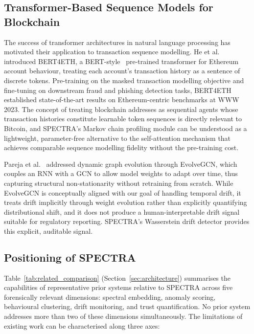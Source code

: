 \subsection{Transformer-Based Sequence Models for Blockchain}
\label{subsec:transformers}

The success of transformer architectures in natural language processing has
motivated their application to transaction sequence modelling.  He et
al.~\cite{He2023} introduced BERT4ETH, a BERT-style~\cite{Lin2017}
pre-trained transformer for Ethereum account behaviour, treating each account's
transaction history as a sentence of discrete tokens.  Pre-training on the
masked transaction modelling objective and fine-tuning on downstream fraud and
phishing detection tasks, BERT4ETH established state-of-the-art results on
Ethereum-centric benchmarks at WWW 2023.  The concept of treating blockchain
addresses as sequential agents whose transaction histories constitute learnable
token sequences is directly relevant to Bitcoin, and SPECTRA's Markov chain
profiling module can be understood as a lightweight, parameter-free alternative
to the self-attention mechanism that achieves comparable sequence modelling
fidelity without the pre-training cost.

Pareja et al.~\cite{Pareja2020} addressed dynamic graph evolution through
EvolveGCN, which couples an RNN with a GCN to allow model weights to adapt over
time, thus capturing structural non-stationarity without retraining from
scratch.  While EvolveGCN is conceptually aligned with our goal of handling
temporal drift, it treats drift implicitly through weight evolution rather than
explicitly quantifying distributional shift, and it does not produce a
human-interpretable drift signal suitable for regulatory reporting.  SPECTRA's
Wasserstein drift detector provides this explicit, auditable signal.

\subsection{Positioning of SPECTRA}
\label{subsec:positioning}

Table~\ref{tab:related_comparison} (Section~\ref{sec:architecture}) summarises
the capabilities of representative prior systems relative to SPECTRA across
five forensically relevant dimensions: spectral embedding, anomaly scoring,
behavioural clustering, drift monitoring, and trust quantification.  No prior
system addresses more than two of these dimensions simultaneously.  The
limitations of existing work can be characterised along three axes:

